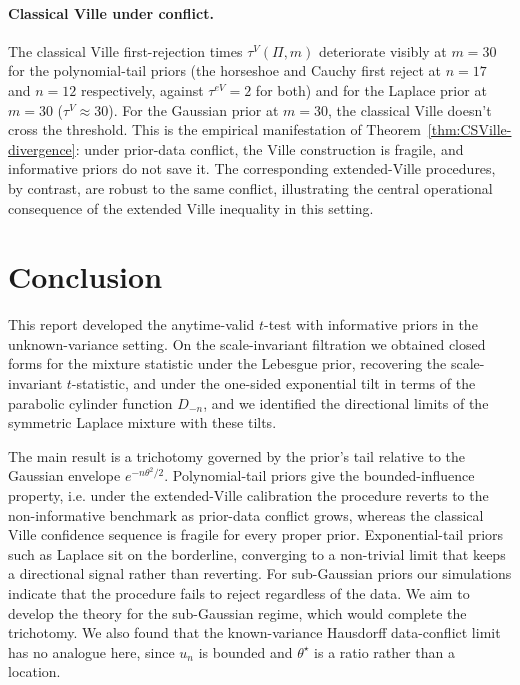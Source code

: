 \documentclass{article}%
\newcommand{\1}{\mathbf{1}}
\begin{document}
\paragraph{Classical Ville under conflict.}
The classical Ville first-rejection times $\tau^{V}(\Pi, m)$ deteriorate visibly at $m = 30$ for the polynomial-tail priors (the
horseshoe and Cauchy first reject at $n = 17$ and $n = 12$ respectively, against $\tau^{eV} = 2$ for both) and for the Laplace prior at $m = 30$ ($\tau^{V} \approx 30$). For the Gaussian prior at $m=30$, the classical Ville doesn't cross the threshold. This is the empirical manifestation of Theorem~\ref{thm:CSVille-divergence}: under prior-data conflict, the Ville construction is fragile, and informative priors do not save it. The corresponding extended-Ville procedures, by contrast, are robust to the same conflict, illustrating the central operational consequence of the extended Ville inequality in this setting.


\section{Conclusion}

This report developed the anytime-valid $t$-test with informative priors in the
unknown-variance setting. On the scale-invariant filtration we obtained closed
forms for the mixture statistic under the Lebesgue prior, recovering the
scale-invariant $t$-statistic, and under the one-sided exponential tilt in terms
of the parabolic cylinder function $D_{-n}$, and we identified the directional
limits of the symmetric Laplace mixture with these tilts.

The main result is a trichotomy governed by the prior's tail relative to the
Gaussian envelope $e^{-n\theta^2/2}$. Polynomial-tail priors give the
bounded-influence property, i.e. under the extended-Ville calibration the procedure reverts to the non-informative benchmark as prior-data conflict grows, whereas the classical Ville confidence sequence is fragile for every proper prior. Exponential-tail priors such as Laplace sit on the borderline, converging to a non-trivial limit that keeps a directional signal rather than reverting. For sub-Gaussian priors our
simulations indicate that the procedure fails to reject regardless of the data. We
aim to develop the theory for the sub-Gaussian regime, which would complete the trichotomy. We also found that the known-variance Hausdorff data-conflict limit has no analogue here, since $u_n$ is bounded and $\theta^\star$ is a ratio rather than a location.
\end{document}
